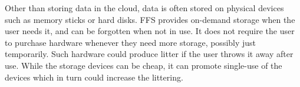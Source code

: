 Other than storing data in the cloud, data is often stored on physical devices such as memory sticks or hard disks. \gls{FFS} provides \mbox{on-demand} storage when the user needs it, and can be forgotten when not in use. It does not require the user to purchase hardware whenever they need more storage, possibly just temporarily. Such hardware could produce litter if the user throws it away after use. While the storage devices can be cheap, it can promote \mbox{single-use} of the devices which in turn could increase the littering.

